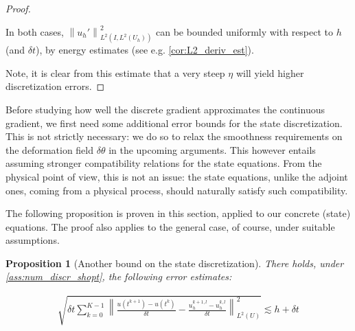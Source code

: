 \documentclass[english,a4paper,10pt,oneside]{scrbook}	%
\theoremstyle{break}
\newtheorem{prop}[equation]{Proposition}
\newenvironment{mproof}[1][\proofname]{%
  \begin{proof}[#1]$ $\par\nobreak\ignorespaces
}{%
  \end{proof}
}
\renewcommand*{\proofname}{Proof}
\theoremstyle{remark}
\newcommand{\norm}[1]{\left\lVert#1\right\rVert}
\begin{document}
\begin{mproof}
In both cases, $\norm{u_h'}_{L^2(I,L^2(U_h))}^2$ can be bounded uniformly with respect to $h$ (and $\delta t$), by energy estimates (see e.g. \cref{cor:L2_deriv_est}).

Note, it is clear from this estimate that a very steep $\eta$ will yield higher discretization errors.


\end{mproof}

Before studying how well the discrete gradient approximates the continuous gradient, we first need some additional error bounds for the state discretization. This is not strictly necessary: we do so to relax the smoothness requirements on the deformation field $\delta \theta$ in the upcoming arguments. This however entails assuming stronger compatibility relations for the state equations. From the physical point of view, this is not an issue: the state equations, unlike the adjoint ones, coming from a physical process, should naturally satisfy such compatibility. 

The following proposition is proven in this section, applied to our concrete (state) equations. The proof also applies to the general case, of course, under suitable assumptions.

\begin{prop}[Another bound on the state discretization]
\label{prop:another_bound}
There holds, under \cref{ass:num_discr_shopt}, the following error estimates:

\begin{align*}
	\sqrt{\delta t \sum_{k=0}^{K-1} \norm{\frac{u(t^{k+1})-u(t^k)}{\delta t} - \frac{u_h^{k+1,l}-u_h^{k, l}}{\delta t}}_{L^2(U)}^2}\lesssim h + \delta t
\end{align*}

\end{prop}
\end{document}
